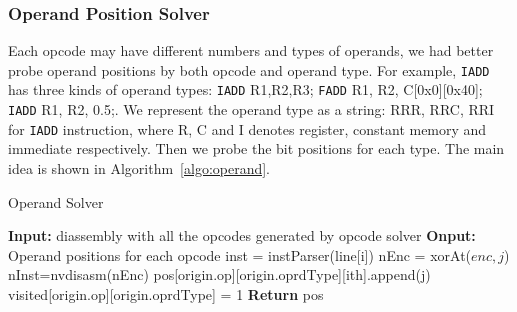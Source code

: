 \subsubsection{Operand Position Solver}
Each opcode may have different numbers and types of operands, we had better probe operand positions by both opcode and operand type. 
For example, {\tt IADD} has three kinds of operand types: {\tt IADD} R1,R2,R3; {\tt FADD} R1, R2,
C[0x0][0x40]; {\tt IADD} R1, R2, 0.5;. We represent the operand type as a string:
RRR, RRC, RRI for {\tt IADD} instruction, where R, C and I denotes register, constant
memory and immediate respectively. Then we probe the bit positions for each type.
The main idea is shown in Algorithm~\ref{algo:operand}.
\begin{algorithm}[htbp]
      \caption{Operand Solver}\label{algo:operand}
  \begin{algorithmic}[1]
      \State \textbf {Input:} diassembly with all the opcodes generated by opcode solver
      \State \textbf {Onput:} Operand positions for each opcode
      \State inst = instParser(line[i])
      \State nEnc = xorAt($enc, j$)
      \State nInst=nvdisasm(nEnc)
      \State pos[origin.op][origin.oprdType][ith].append(j)
      \State visited[origin.op][origin.oprdType] = 1
      \EndIf
      \EndFor
      \EndFor
      \State \textbf{Return} pos 
  \end{algorithmic}
\end{algorithm}
